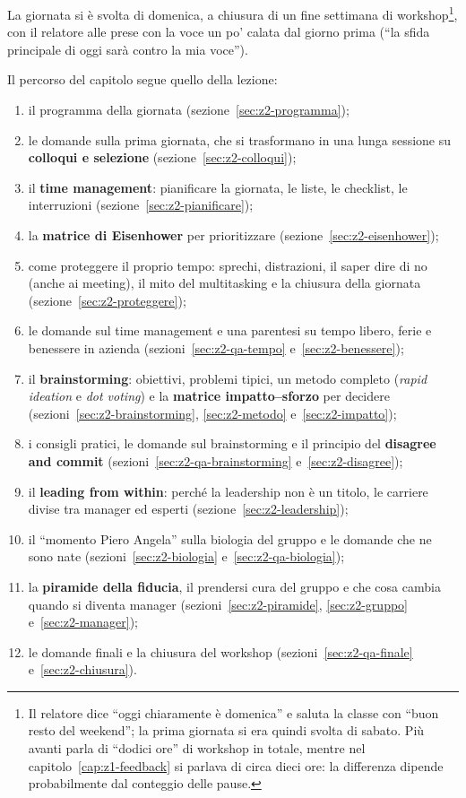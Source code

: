 La giornata si è svolta di domenica, a chiusura di un fine settimana di
workshop\footnote{Il relatore dice ``oggi chiaramente è domenica'' e saluta
la classe con ``buon resto del weekend''; la prima giornata si era quindi
svolta di sabato. Più avanti parla di ``dodici ore'' di workshop in totale,
mentre nel capitolo~\ref{cap:z1-feedback} si parlava di circa dieci ore: la
differenza dipende probabilmente dal conteggio delle pause.}, con il
relatore alle prese con la voce un po' calata dal giorno prima (``la sfida
principale di oggi sarà contro la mia voce'').

Il percorso del capitolo segue quello della lezione:
\begin{enumerate}
  \item il programma della giornata (sezione~\ref{sec:z2-programma});
  \item le domande sulla prima giornata, che si trasformano in una lunga
        sessione su \textbf{colloqui e selezione}
        (sezione~\ref{sec:z2-colloqui});
  \item il \textbf{time management}: pianificare la giornata, le liste, le
        checklist, le interruzioni (sezione~\ref{sec:z2-pianificare});
  \item la \textbf{matrice di Eisenhower} per prioritizzare
        (sezione~\ref{sec:z2-eisenhower});
  \item come proteggere il proprio tempo: sprechi, distrazioni, il saper dire
        di no (anche ai meeting), il mito del multitasking e la chiusura della
        giornata (sezione~\ref{sec:z2-proteggere});
  \item le domande sul time management e una parentesi su tempo libero, ferie
        e benessere in azienda (sezioni~\ref{sec:z2-qa-tempo}
        e~\ref{sec:z2-benessere});
  \item il \textbf{brainstorming}: obiettivi, problemi tipici, un metodo
        completo (\emph{rapid ideation} e \emph{dot voting}) e la
        \textbf{matrice impatto--sforzo} per decidere
        (sezioni~\ref{sec:z2-brainstorming}, \ref{sec:z2-metodo}
        e~\ref{sec:z2-impatto});
  \item i consigli pratici, le domande sul brainstorming e il principio del
        \textbf{disagree and commit} (sezioni~\ref{sec:z2-qa-brainstorming}
        e~\ref{sec:z2-disagree});
  \item il \textbf{leading from within}: perché la leadership non è un
        titolo, le carriere divise tra manager ed esperti
        (sezione~\ref{sec:z2-leadership});
  \item il ``momento Piero Angela'' sulla biologia del gruppo e le domande
        che ne sono nate (sezioni~\ref{sec:z2-biologia}
        e~\ref{sec:z2-qa-biologia});
  \item la \textbf{piramide della fiducia}, il prendersi cura del gruppo e
        che cosa cambia quando si diventa manager
        (sezioni~\ref{sec:z2-piramide}, \ref{sec:z2-gruppo}
        e~\ref{sec:z2-manager});
  \item le domande finali e la chiusura del workshop
        (sezioni~\ref{sec:z2-qa-finale} e~\ref{sec:z2-chiusura}).
\end{enumerate}

